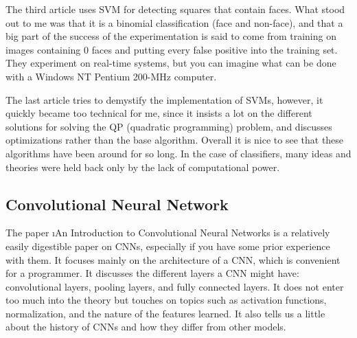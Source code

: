The third article uses SVM for detecting squares that contain faces. What stood out to me was that it is a binomial classification (face and non-face), and that a big part of the success of the experimentation is said to come from training on images containing 0 faces and putting every false positive into the training set. They experiment on real-time systems, but you can imagine what can be done with a Windows NT Pentium 200-MHz computer.

The last article tries to demystify the implementation of SVMs, however, it quickly became too technical for me, since it insists a lot on the different solutions for solving the QP (quadratic programming) problem, and discusses optimizations rather than the base algorithm. Overall it is nice to see that these algorithms have been around for so long. In the case of classifiers, many ideas and theories were held back only by the lack of computational power.



\subsection{Convolutional Neural Network}

The paper \i{An Introduction to Convolutional Neural Networks}\cite{cnn} is a relatively easily digestible paper on CNNs, especially if you have some prior experience with them. It focuses mainly on the architecture of a CNN, which is convenient for a programmer. It discusses the different layers a CNN might have: convolutional layers, pooling layers, and fully connected layers. It does not enter too much into the theory but touches on topics such as activation functions, normalization, and the nature of the features learned. It also tells us a little about the history of CNNs and how they differ from other models.
